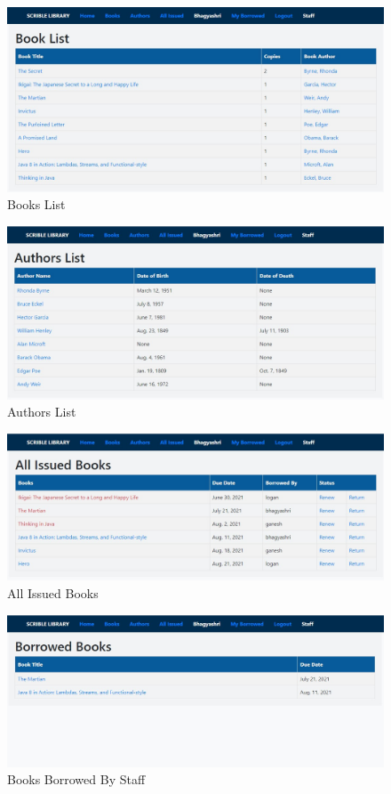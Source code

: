 \documentclass[12pt, a4paper]{report}
\begin{document}
\newpage
\begin{figure}[htb]
	\centering
	\includegraphics[scale=0.5]{./books} 
	\caption{Books List}
	\label{fig:books} 
\end{figure}
\newpage
\begin{figure}[htb]
	\centering
	\includegraphics[scale=0.5]{./authors} 
	\caption{Authors List}
	\label{fig:listauthor} 
\end{figure}
\newpage
\begin{figure}[htb]
	\centering
	\includegraphics[scale=0.5]{./issued} 
	\caption{All Issued Books}
	\label{fig:issued} 
\end{figure}
\newpage
\begin{figure}[htb]
	\centering
	\includegraphics[scale=0.5]{./borrowed} 
	\caption{Books Borrowed By Staff}
	\label{fig:students} 
\end{figure}
\end{document}
